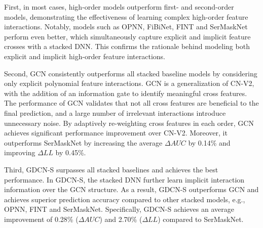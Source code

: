 \documentclass[sigconf]{acmart}
\begin{document}
First, in most cases, high-order models outperform first- and second-order models, demonstrating the effectiveness of learning complex high-order feature interactions. Notably, models such as OPNN, FiBiNet, FINT and SerMaskNet perform even better, which simultaneously capture explicit and implicit feature crosses with a stacked DNN. This confirms the rationale behind modeling both explicit and implicit high-order feature interactions. 

Second, GCN consistently outperforms all stacked baseline models by considering only explicit polynomial feature interactions. GCN is a generalization of CN-V2, with the addition of an information gate to identify meaningful cross features. The performance of GCN validates that not all cross features are beneficial to the final prediction, and a large number of irrelevant interactions introduce unnecessary noise. By adaptively re-weighting cross features in each order, GCN achieves significant performance improvement over CN-V2. Moreover, it outperforms SerMaskNet by increasing the average $\Delta{AUC}$ by 0.14\% and improving $\Delta{LL}$ by 0.45\%.

Third, GDCN-S surpasses all stacked baselines and achieves the best performance. In GDCN-S, the stacked DNN further learn implicit interaction information over the GCN structure. As a result,  GDCN-S outperforms GCN and achieves superior prediction accuracy compared to other stacked models, e.g., OPNN, FINT and SerMaskNet. Specifically, GDCN-S achieves an average improvement of 0.28\% ($\Delta{AUC}$) and 2.70\% ($\Delta{LL}$) compared to SerMaskNet. 
\end{document}
